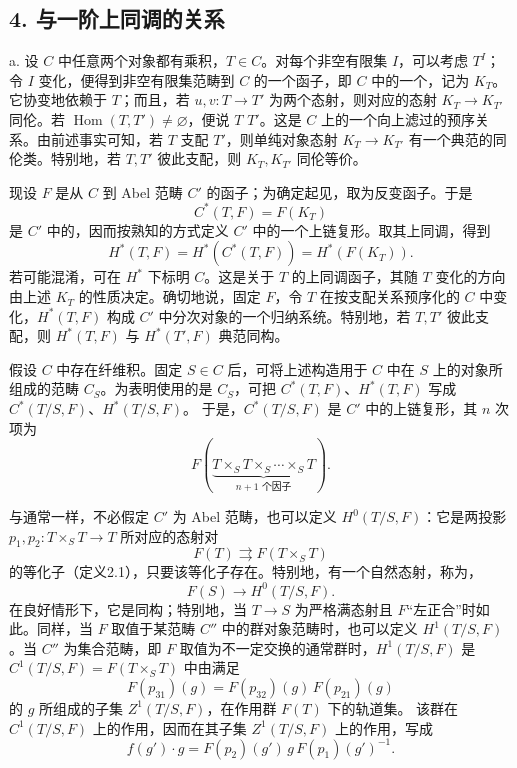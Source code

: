 \subsection*{4. 与一阶上同调的关系}
a. 设 $C$ 中任意两个对象都有乘积，$T\in C$。对每个非空有限集 $I$，可以考虑 $T^I$；令 $I$ 变化，便得到非空有限集范畴到 $C$ 的一个函子，即 $C$ 中的一个，记为 $K_T$。
它协变地依赖于 $T$；而且，若 $u,v:T\to T'$ 为两个态射，则对应的态射 $K_T\to K_{T'}$ 同伦。若 $\operatorname{Hom}(T,T')\ne\varnothing$，便说 $T$  $T'$。这是 $C$ 上的一个向上滤过的预序关系。由前述事实可知，若 $T$ 支配 $T'$，则单纯对象态射 $K_T\to K_{T'}$ 有一个典范的同伦类。特别地，若 $T,T'$ 彼此支配，则 $K_T,K_{T'}$ 同伦等价。

现设 $F$ 是从 $C$ 到 Abel 范畴 $C'$ 的函子；为确定起见，取为反变函子。于是
\[
C^*(T,F)=F(K_T)
\]
是 $C'$ 中的，因而按熟知的方式定义 $C'$ 中的一个上链复形。取其上同调，得到
\[
H^*(T,F)=H^*(C^*(T,F))=H^*(F(K_T)).
\]
若可能混淆，可在 $H^*$ 下标明 $C$。这是关于 $T$ 的上同调函子，其随 $T$ 变化的方向由上述 $K_T$ 的性质决定。确切地说，固定 $F$，令 $T$ 在按支配关系预序化的 $C$ 中变化，$H^*(T,F)$ 构成 $C'$ 中分次对象的一个归纳系统。特别地，若 $T,T'$ 彼此支配，则 $H^*(T,F)$ 与 $H^*(T',F)$ 典范同构。

假设 $C$ 中存在纤维积。固定 $S\in C$ 后，可将上述构造用于 $C$ 中在 $S$ 上的对象所组成的范畴 $C_S$。为表明使用的是 $C_S$，可把 $C^*(T,F)$、$H^*(T,F)$ 写成 $C^*(T/S,F)$、$H^*(T/S,F)$。
于是，$C^*(T/S,F)$ 是 $C'$ 中的上链复形，其 $n$ 次项为
\[
F(\underbrace{T\times_ST\times_S\cdots\times_ST}_{n+1\text{ 个因子}}).
\]

与通常一样，不必假定 $C'$ 为 Abel 范畴，也可以定义 $H^0(T/S,F)$：它是两投影 $p_1,p_2:T\times_ST\to T$ 所对应的态射对
\[
F(T)\rightrightarrows F(T\times_ST)
\]
的等化子（定义2.1），只要该等化子存在。特别地，有一个自然态射，称为，
\[
F(S)\longrightarrow H^0(T/S,F).
\]
在良好情形下，它是同构；特别地，当 $T\to S$ 为严格满态射且 $F$“左正合”时如此。同样，当 $F$ 取值于某范畴 $C''$ 中的群对象范畴时，也可以定义 $H^1(T/S,F)$。当 $C''$ 为集合范畴，即 $F$ 取值为不一定交换的通常群时，$H^1(T/S,F)$ 是 $C^1(T/S,F)=F(T\times_ST)$ 中由满足
\[
F(p_{31})(g)=F(p_{32})(g)\,F(p_{21})(g)
\]
的 $g$ 所组成的子集 $Z^1(T/S,F)$，在作用群 $F(T)$ 下的轨道集。
该群在 $C^1(T/S,F)$ 上的作用，因而在其子集 $Z^1(T/S,F)$ 上的作用，写成
\[
f(g')\cdot g=F(p_2)(g')\,g\,F(p_1)(g')^{-1}.
\]


